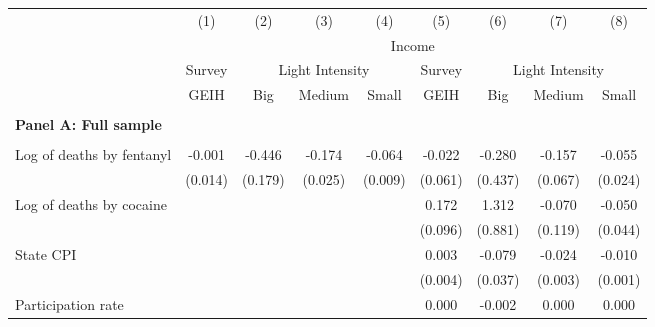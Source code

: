 \begin{tabular}{lcccccccc} \\ \hline 
                    &\multicolumn{1}{c}{(1)}         &\multicolumn{1}{c}{(2)}         &\multicolumn{1}{c}{(3)}         &\multicolumn{1}{c}{(4)}         &\multicolumn{1}{c}{(5)}         &\multicolumn{1}{c}{(6)}         &\multicolumn{1}{c}{(7)}         &\multicolumn{1}{c}{(8)}         \\
 & \multicolumn{8}{c}{Income} \\ \cline{2-5} \cline{6-9}   & Survey  &  \multicolumn{3}{c}{Light Intensity} & Survey & \multicolumn{3}{c}{Light Intensity} \\ \cline{3-5} \cline{7-9} & GEIH & Big & Medium & Small & GEIH & Big & Medium & Small \\ \hline  & & & & &  &  &  &  \\ \textbf{Panel A: Full sample} \\ & & & & & & & & \\
Log of deaths by fentanyl&      -0.001         &      -0.446\sym{**} &      -0.174\sym{***}&      -0.064\sym{***}&      -0.022         &      -0.280         &      -0.157\sym{*}  &      -0.055\sym{*}  \\
                    &     (0.014)         &     (0.179)         &     (0.025)         &     (0.009)         &     (0.061)         &     (0.437)         &     (0.067)         &     (0.024)         \\
\addlinespace
Log of deaths by cocaine&                     &                     &                     &                     &       0.172         &       1.312         &      -0.070         &      -0.050         \\
                    &                     &                     &                     &                     &     (0.096)         &     (0.881)         &     (0.119)         &     (0.044)         \\
\addlinespace
State CPI           &                     &                     &                     &                     &       0.003         &      -0.079\sym{*}  &      -0.024\sym{***}&      -0.010\sym{***}\\
                    &                     &                     &                     &                     &     (0.004)         &     (0.037)         &     (0.003)         &     (0.001)         \\
\addlinespace
Participation rate  &                     &                     &                     &                     &       0.000         &      -0.002         &       0.000         &       0.000         \\

\end{tabular}
